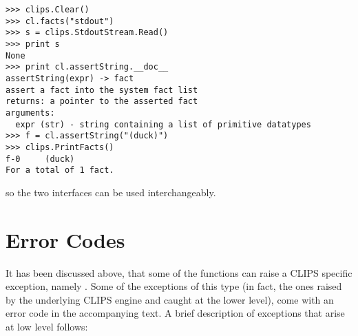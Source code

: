\begin{verbatim}
>>> clips.Clear()
>>> cl.facts("stdout")
>>> s = clips.StdoutStream.Read()
>>> print s
None
>>> print cl.assertString.__doc__
assertString(expr) -> fact
assert a fact into the system fact list
returns: a pointer to the asserted fact
arguments:
  expr (str) - string containing a list of primitive datatypes
>>> f = cl.assertString("(duck)")
>>> clips.PrintFacts()
f-0     (duck)
For a total of 1 fact.
\end{verbatim}

so the two interfaces can be used interchangeably.



\chapter{Error Codes\label{pyclips-errors}}

It has been discussed above, that some of the \pyclips{} functions can
raise a CLIPS specific exception, namely . Some
of the exceptions of this type (in fact, the ones raised by the
underlying CLIPS engine and caught at the lower level), come with an
error code in the accompanying text. A brief description of exceptions
that arise at low level follows:

